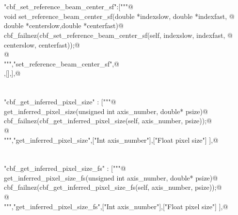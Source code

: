 \documentclass[10pt,a4paper,twoside,notitlepage]{article}
\begin{document}
\begin{flushleft}
\begin{minipage}{\linewidth}
\begin{list}{}{}
\mbox{}\verb@@\\
\mbox{}\verb@@\\
\mbox{}\verb@"cbf_set_reference_beam_center_sf":["""@\\
\mbox{}\verb@    void set_reference_beam_center_sf(double *indexslow, double *indexfast, @\\
\mbox{}\verb@                         double *centerslow,double *centerfast){@\\
\mbox{}\verb@        cbf_failnez(cbf_set_reference_beam_center_sf(self, indexslow, indexfast, @\\
\mbox{}\verb@                                       centerslow, centerfast));@\\
\mbox{}\verb@        }@\\
\mbox{}\verb@""","set_reference_beam_center_sf",@\\
\mbox{},[],],@\\
\mbox{}\verb@@\\
\mbox{}\verb@@\\
\mbox{}\verb@"cbf_get_inferred_pixel_size" : ["""@\\
\mbox{}\verb@%apply double *OUTPUT { double *psize } get_inferred_pixel_size;@\\
\mbox{}\verb@void get_inferred_pixel_size(unsigned int axis_number, double* psize){@\\
\mbox{}\verb@   cbf_failnez(cbf_get_inferred_pixel_size(self, axis_number, psize));@\\
\mbox{}\verb@   }@\\
\mbox{}\verb@""","get_inferred_pixel_size",["Int axis_number"],["Float pixel size"] ],@\\
\mbox{}\verb@@\\
\mbox{}\verb@@\\
\mbox{}\verb@"cbf_get_inferred_pixel_size_fs" : ["""@\\
\mbox{}\verb@%apply double *OUTPUT { double *psize } get_inferred_pixel_size;@\\
\mbox{}\verb@void get_inferred_pixel_size_fs(unsigned int axis_number, double* psize){@\\
\mbox{}\verb@   cbf_failnez(cbf_get_inferred_pixel_size_fs(self, axis_number, psize));@\\
\mbox{}\verb@   }@\\
\mbox{}\verb@""","get_inferred_pixel_size_fs",["Int axis_number"],["Float pixel size"] ],@\\
\mbox{}\verb@@\\

\end{list}
\end{minipage}
\end{flushleft}
\end{document}
